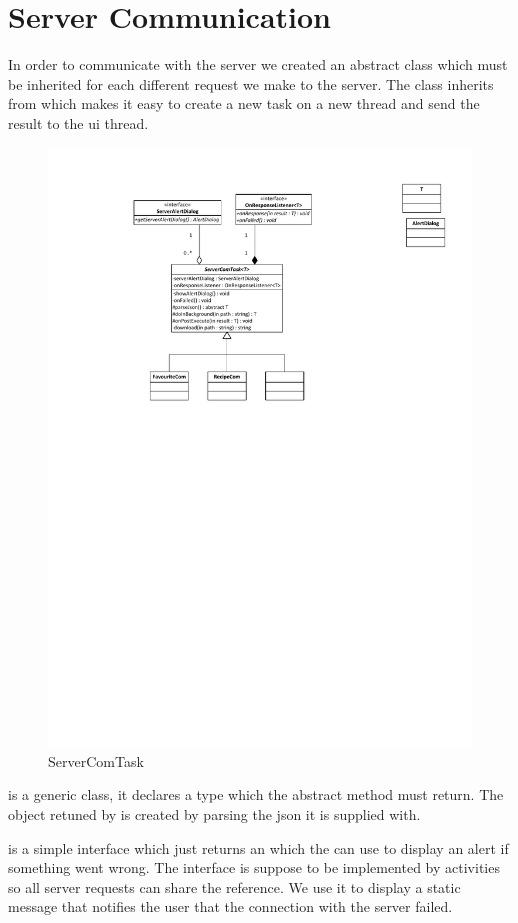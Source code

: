\section{Server Communication}
In order to communicate with the server we created an abstract class which must be inherited for each different request we make to the server. The class inherits from  which makes it easy to create a new task on a new thread and send the result to the \ac{ui} thread.

\begin{figure}[H]
\centering
\includegraphics[width=0.7\linewidth, page=2]{img/servercomtask.pdf}
\caption{ServerComTask}
\label{fig:servercomtask}
\end{figure}
 is a generic class, it declares a type which the abstract method  must return. The object retuned by  is created by parsing the \ac{json} it is supplied with.

 is a simple interface which just returns an  which the  can use to display an alert if something went wrong. The interface is suppose to be implemented by activities so all server requests can share the  reference. We use it to display a static message that notifies the user that the connection with the server failed.


